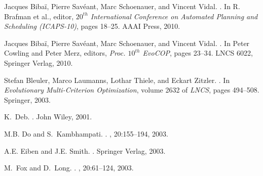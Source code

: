 \documentclass[letterpaper]{article}
\begin{document}
\newpage
% 
% 

\begin{thebibliography}{}

Jacques Biba{\"i}, Pierre Sav\'eant, Marc Schoenauer, and Vincent Vidal.
.
\newblock In {R. Brafman et al.}, editor, {\em $20^{th}$ International
  Conference on Automated Planning and Scheduling (ICAPS-10)}, pages 18--25.
  AAAI Press, 2010.

Jacques Biba{\"i}, Pierre Sav\'eant, Marc Schoenauer, and Vincent Vidal.
.
\newblock In Peter Cowling and Peter Merz, editors, {\em Proc. $10^{th}$
  EvoCOP}, pages 23--34. LNCS 6022, Springer Verlag, 2010.

Stefan Bleuler, Marco Laumanns, Lothar Thiele, and Eckart Zitzler.
.
\newblock In {\em Evolutionary Multi-Criterion Optimization}, volume 2632 of
  {\em LNCS}, pages 494--508. Springer, 2003.

K.~Deb.
.
\newblock John Wiley, 2001.

M.B. Do and S.~Kambhampati.
.
, 20:155--194, 2003.

A.E. Eiben and J.E. Smith.
.
\newblock Springer Verlag, 2003.

M.~Fox and D.~Long.
.
, 20:61--124, 2003.


\end{thebibliography}
\end{document}
